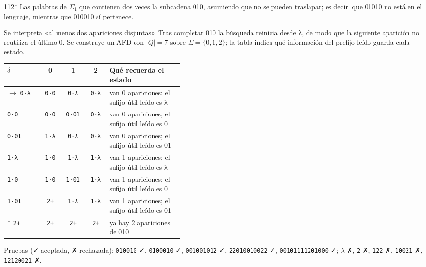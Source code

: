 \documentclass[11pt]{article}
\begin{document}
\begin{ejercicio}{112}{*}
Las palabras de $\Sigma_1$ que contienen dos veces la subcadena 010, asumiendo que no se pueden traslapar; es decir, que 01010 no está en el lenguaje, mientras que 010010 sí pertenece.
\end{ejercicio}
\proc Se interpreta «al menos dos apariciones disjuntas». Tras completar 010 la búsqueda reinicia desde λ, de modo que la siguiente aparición no reutiliza el último 0. Se construye un AFD con $|Q| = 7$ sobre $\Sigma = \{0, 1, 2\}$; la tabla indica qué información del prefijo leído guarda cada estado.
\begin{center}\small\begin{tabular}{lcccp{0.42\linewidth}}\toprule
$\delta$ & 0 & 1 & 2 & Qué recuerda el estado \\\midrule
$\to$ \texttt{0·λ} & \texttt{0·0} & \texttt{0·λ} & \texttt{0·λ} & van 0 apariciones; el sufijo útil leído es λ \\
 \texttt{0·0} & \texttt{0·0} & \texttt{0·01} & \texttt{0·λ} & van 0 apariciones; el sufijo útil leído es 0 \\
 \texttt{0·01} & \texttt{1·λ} & \texttt{0·λ} & \texttt{0·λ} & van 0 apariciones; el sufijo útil leído es 01 \\
 \texttt{1·λ} & \texttt{1·0} & \texttt{1·λ} & \texttt{1·λ} & van 1 apariciones; el sufijo útil leído es λ \\
 \texttt{1·0} & \texttt{1·0} & \texttt{1·01} & \texttt{1·λ} & van 1 apariciones; el sufijo útil leído es 0 \\
 \texttt{1·01} & \texttt{2+} & \texttt{1·λ} & \texttt{1·λ} & van 1 apariciones; el sufijo útil leído es 01 \\
$*$ \texttt{2+} & \texttt{2+} & \texttt{2+} & \texttt{2+} & ya hay 2 apariciones de 010 \\
\bottomrule\end{tabular}\end{center}
Pruebas (✓ aceptada, ✗ rechazada): \texttt{010010} ✓, \texttt{0100010} ✓, \texttt{001001012} ✓, \texttt{22010010022} ✓, \texttt{00101111201000} ✓; $\lambda$ ✗, \texttt{2} ✗, \texttt{122} ✗, \texttt{10021} ✗, \texttt{12120021} ✗.
\end{document}
